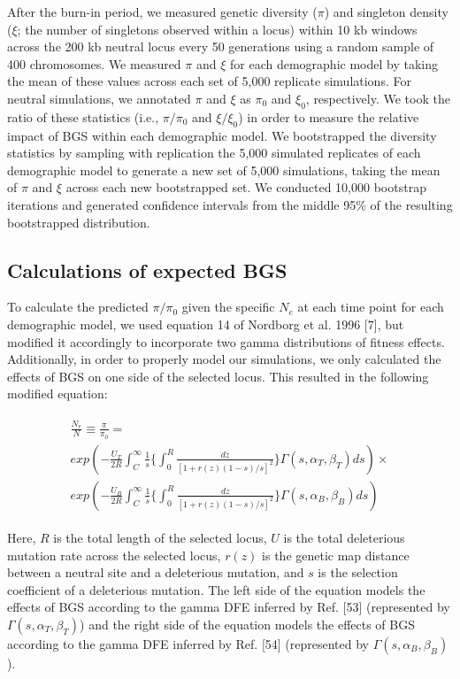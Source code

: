 \documentclass[9pt,twocolumn,twoside]{rilabRxiv}
\begin{document}
After the burn-in period, we measured genetic diversity ($\pi$) and singleton density ($\xi$; the number of singletons observed within a locus) within 10 kb windows across the 200 kb neutral locus every 50 generations using a random sample of 400 chromosomes. 
We measured $\pi$ and $\xi$ for each demographic model by taking the mean of these values across each set of 5,000 replicate simulations. 
For neutral simulations, we annotated $\pi$ and $\xi$ as $\pi_0$ and $\xi_0$, respectively. 
We took the ratio of these statistics (i.e., $\pi/\pi_0$ and $\xi/\xi_0$) in order to measure the relative impact of BGS within each demographic model. 
We bootstrapped the diversity statistics by sampling with replication the 5,000 simulated replicates of each demographic model to generate a new set of 5,000 simulations, taking the mean of $\pi$ and $\xi$ across each new bootstrapped set. 
We conducted 10,000 bootstrap iterations and generated confidence intervals from the middle 95\% of the resulting bootstrapped distribution.

\subsection{Calculations of expected BGS}

To calculate the predicted $\pi/\pi_0$ given the specific $N_e$ at each time point for each demographic model, we used equation 14 of Nordborg et al. 1996 [7], but modified it accordingly to incorporate two gamma distributions of fitness effects.
Additionally, in order to properly model our simulations, we only calculated the effects of BGS on one side of the selected locus. 
This resulted in the following modified equation:


\begin{eqnarray*}  
\begin{aligned}
\frac{N_e}{N}\equiv\frac{\pi}{\pi_0}= \\
exp\left( -\frac{U_T}{2R}\int^{\infty}_C\frac{1}{s}\bigg\{\int_0^R\frac{dz}{[1+r(z)(1-s)/s]^2}\bigg\}\Gamma(s,\alpha_T,\beta_T)ds \right)\times \\
    exp\left( -\frac{U_B}{2R}\int^{\infty}_C\frac{1}{s}\bigg\{\int_0^R\frac{dz}{[1+r(z)(1-s)/s]^2}\bigg\}\Gamma(s,\alpha_B,\beta_B)ds \right)
    \end{aligned}
\end{eqnarray*}  



Here, $R$ is the total length of the selected locus, $U$ is the total deleterious mutation rate across the selected locus, $r(z)$ is the genetic map distance between a neutral site and a deleterious mutation, and $s$ is the selection coefficient of a deleterious mutation. 
The left side of the equation models the effects of BGS according to the gamma DFE inferred by Ref. [53] (represented by $\Gamma(s,\alpha_T,\beta_T)$) and the right side of the equation models the effects of BGS according to the gamma DFE inferred by Ref. [54] (represented by $\Gamma(s,\alpha_B,\beta_B)$).
\end{document}
